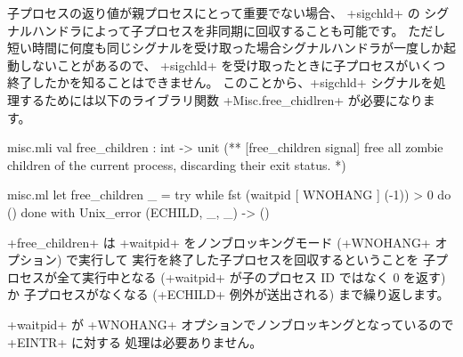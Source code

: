 \begin{example}\label{ex/childs}
子プロセスの返り値が親プロセスにとって重要でない場合、 \ml+sigchld+ の
シグナルハンドラによって子プロセスを非同期に回収することも可能です。
ただし短い時間に何度も同じシグナルを受け取った場合シグナルハンドラが一度しか起動しないことがあるので、
\ml+sigchld+ を受け取ったときに子プロセスがいくつ終了したかを知ることはできません。
このことから、\ml+sigchld+ シグナルを処理するためには以下のライブラリ関数 \ml+Misc.free_chidlren+ が必要になります。
%
\begin{codefile}{misc.mli}
val free_children : int -> unit
(** [free_children signal] free all zombie children of the current process,
    discarding their exit status. *)
\end{codefile}
%
\begin{listingcodefile}{misc.ml}
let free_children _ =
  try while fst (waitpid [ WNOHANG ] (-1)) > 0 do () done
  with Unix_error (ECHILD, _, _) -> ()
\end{listingcodefile}
%
\ml+free_children+ は \ml+waitpid+ をノンブロッキングモード (\ml+WNOHANG+ オプション) で実行して
実行を終了した子プロセスを回収するということを
子プロセスが全て実行中となる (\ml+waitpid+ が子のプロセス ID ではなく 0 を返す) か
子プロセスがなくなる (\ml+ECHILD+ 例外が送出される) まで繰り返します。

\ml+waitpid+ が \ml+WNOHANG+ オプションでノンブロッキングとなっているので \ml+EINTR+ に対する
処理は必要ありません。
\end{example}

